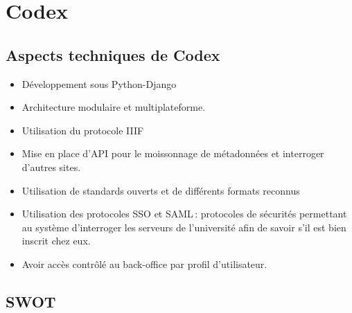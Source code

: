 \section{Codex}

\subsection{Aspects techniques de Codex}

\begin{itemize}
	\item Développement sous Python-Django 
\item Architecture modulaire et multiplateforme. 
\item Utilisation du protocole IIIF 
\item Mise en place d’API pour le moissonnage de métadonnées et interroger d’autres sites. 
\item Utilisation de standards ouverts et de différents formats reconnus 
\item Utilisation des protocoles SSO et SAML : protocoles de sécurités permettant au système d’interroger les serveurs de l’université afin de savoir s’il est bien inscrit chez eux. 
\item Avoir accès contrôlé au back-office par profil d’utilisateur. 
\end{itemize}
\vfill

\subsection{SWOT} 

